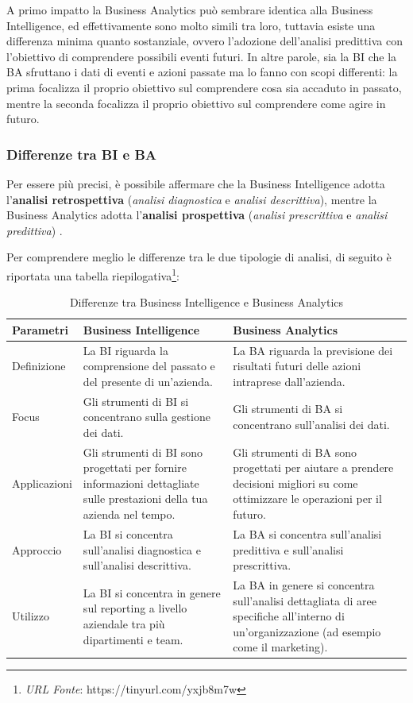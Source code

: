 A primo impatto la Business Analytics può sembrare identica alla Business Intelligence, ed effettivamente sono molto simili tra loro, tuttavia esiste una differenza minima quanto sostanziale, ovvero l'adozione dell'analisi predittiva con l'obiettivo di comprendere possibili eventi futuri. In altre parole, sia la BI che la BA sfruttano i dati di eventi e azioni passate ma lo fanno con scopi differenti: la prima focalizza il proprio obiettivo sul comprendere cosa sia accaduto in passato, mentre la seconda focalizza il proprio obiettivo sul comprendere come agire in futuro.

\subsubsection{Differenze tra BI e BA}
Per essere più precisi, è possibile affermare che la Business Intelligence adotta l'\textbf{analisi retrospettiva} (\textit{analisi diagnostica} e \textit{analisi descrittiva}), mentre la Business Analytics adotta l'\textbf{analisi prospettiva} (\textit{analisi prescrittiva} e \textit{analisi predittiva}) \cite{researchgate_bi_and_ba_analytics}.

Per comprendere meglio le differenze tra le due tipologie di analisi, di seguito è riportata una tabella riepilogativa\footnote{\textit{URL Fonte}: https://tinyurl.com/yxjb8m7w}:

\begin{longtable}{|p{4cm}|p{5cm}|p{5cm}|}
    \caption{Differenze tra Business Intelligence e Business Analytics}
    \label{tab:data_mart_vs_data_warehouse}\\
    \hline
    \textbf{Parametri} & \textbf{Business Intelligence} & \textbf{Business Analytics}\\
    \hline
    \endfirsthead

        Definizione & 
        La BI riguarda la comprensione del passato e del presente di un'azienda.& La BA riguarda la previsione dei risultati futuri delle azioni intraprese dall'azienda.\\
        \hline
        Focus & 
        Gli strumenti di BI si concentrano sulla gestione dei dati.& 
        Gli strumenti di BA si concentrano sull'analisi dei dati.\\
        \hline
        Applicazioni & 
        Gli strumenti di BI sono progettati per fornire informazioni dettagliate sulle prestazioni della tua azienda nel tempo.&
        Gli strumenti di BA sono progettati per aiutare a prendere decisioni migliori su come ottimizzare le operazioni per il futuro.\\
        \hline
        Approccio & 
        La BI si concentra sull'analisi diagnostica e sull'analisi descrittiva.& 
        La BA si concentra sull'analisi predittiva e sull'analisi prescrittiva.\\
        \hline
        Utilizzo & 
        La BI si concentra in genere sul reporting a livello aziendale tra più dipartimenti e team.& 
        La BA in genere si concentra sull'analisi dettagliata di aree specifiche all'interno di un'organizzazione (ad esempio come il marketing).\\
    \hline
\end{longtable}


